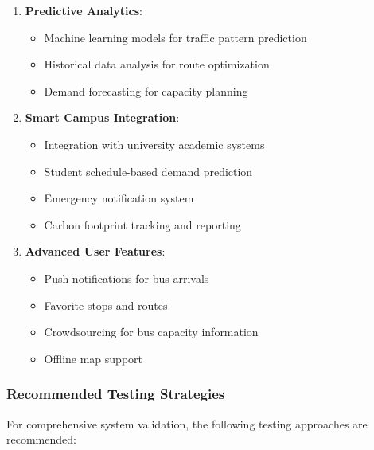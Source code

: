 \documentclass[12pt,a4paper]{article}
\begin{document}
\begin{enumerate}
    \item \textbf{Predictive Analytics}:
    \begin{itemize}
        \item Machine learning models for traffic pattern prediction
        \item Historical data analysis for route optimization
        \item Demand forecasting for capacity planning
    \end{itemize}

    \item \textbf{Smart Campus Integration}:
    \begin{itemize}
        \item Integration with university academic systems
        \item Student schedule-based demand prediction
        \item Emergency notification system
        \item Carbon footprint tracking and reporting
    \end{itemize}

    \item \textbf{Advanced User Features}:
    \begin{itemize}
        \item Push notifications for bus arrivals
        \item Favorite stops and routes
        \item Crowdsourcing for bus capacity information
        \item Offline map support
    \end{itemize}
\end{enumerate}

\subsubsection{Recommended Testing Strategies}

For comprehensive system validation, the following testing approaches are recommended:
\end{document}
